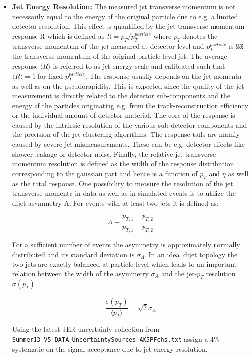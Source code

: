 \begin{itemize}
	\item \textbf{Jet Energy Resolution:}  The measured jet transverse momentum is not necessarily equal to the energy of the original particle due to e.g. a limited detector resolution. This effect is quantified by the jet transverse momentum response R which is defined as $R = p_{T} / p_{T}^{particle}$  where $p_{T}$ denotes the transverse momentum of the jet measured at detector level and $p_{T}^{particle}$ is ￼the transverse momentum of the original particle-level jet. The average response $\langle R \rangle$ is referred to as jet energy scale and calibrated such that $\langle R \rangle = 1$ for fixed $p_{T}^{particle}$. The response usually depends on the jet momenta as well as on the pseudorapidity. This is expected since the quality of the jet measurement is directly related to the detector sub-components and the energy of the particles originating e.g. from the track-reconstruction efficiency or the individual amount of detector material. The core of the response is caused by the intrinsic resolution of the various sub-detector components and the precision of the jet clustering algorithms. The response tails are mainly caused by severe jet-mismeasurements. These can be e.g. detector effects like shower leakage or detector noise. Finally, the relative jet transverse momentum resolution is defined as the width of the response distribution corresponding to the gaussian part and hence is a function of $p_{T}$ and $\eta$ as well as the total response. One possibility to measure the resolution of the jet transverse momenta in data as well as in simulated events is to utilize the dijet asymmetry A. For events with at least two jets it is defined as:
	
	\begin{equation}
	A = \frac{p_{T,1} - p_{T,2}}{p_{T,1} + p_{T,2}}
	\end{equation}
	
	For a sufficient number of events the asymmetry is approximately normally distributed and its standard deviation is $\sigma_{A}$. In an ideal dijet topology the two jets are exactly balanced at particle level which leads to an important relation between the width of the asymmetry $\sigma_{A}$ and the jet-$p_{T}$ resolution $\sigma(p_{T})$:
	
	\begin{equation}
	\frac{\sigma(p_{T})}{\langle p_{T} \rangle} = \sqrt{2} \sigma_{A}
	\end{equation}
	
	Using the latest JER uncertainty collection from \texttt{Summer13\_\-V5\_DATA\_\-Uncertainty\-Sources\_\-AK5PFchs.txt} assign a 4\% systematic on the signal acceptance due to jet energy resolution. 
	

\end{itemize}
